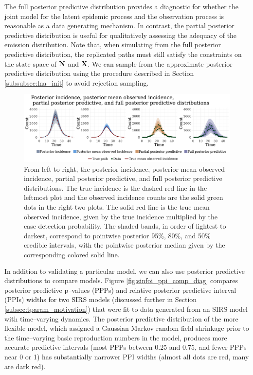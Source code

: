 The full posterior predictive distribution provides a diagnostic for whether the joint model for the latent epidemic process and the observation process is reasonable as a data generating mechanism. In contrast, the partial posterior predictive distribution is useful for qualitatively assessing the adequacy of the emission distribution. Note that, when simulating from the full posterior predictive distribution, the replicated paths must still satisfy the constraints on the state space of $ \mathbf{N} $ and $ \mathbf{X} $. We can sample from the approximate posterior predictive distribution using the procedure described in Section \ref{subsubsec:lna_init} to avoid rejection sampling. 
\begin{figure}[htbp]
	\centering
	\includegraphics[width=\linewidth]{figures/sir_diag_plots}
	\caption[SIR model posterior incidence, posterior mean observed incidence, partial posterior predictive, and full posterior distributions.]{From left to right, the posterior incidence, posterior mean observed incidence, partial posterior predictive, and full posterior predictive distributions. The true incidence is the dashed red line in the leftmost plot and the observed incidence counts are the solid green dots in the right two plots. The solid red line is the true mean observed incidence, given by the true incidence multiplied by the case detection probability. The shaded bands, in order of lightest to darkest, correspond to pointwise posterior 95\%, 80\%, and 50\% credible intervals, with the pointwise posterior median given by the corresponding colored solid line.}
	\label{fig:sirdiagplots}
\end{figure}

In addition to validating a particular model, we can also use posterior predictive distributions to compare models. Figure \ref{fig:sinfoi_ppi_comp_diag} compares posterior predictive p--values (PPPs) and relative posterior predictive interval (PPIs) widths for two SIRS models (discussed further in Section \ref{subsec:tparam_motivation}) that were fit to data generated from an SIRS model with time--varying dynamics. The posterior predictive distribution of the more flexible model, which assigned a Gaussian Markov random field shrinkage prior to the time--varying basic reproduction numbers in the model,  produces more accurate predictive intervals (most PPPs between 0.25 and 0.75, and fewer PPPs near 0 or 1) has substantially narrower PPI widths (almost all dots are red, many are dark red). 

